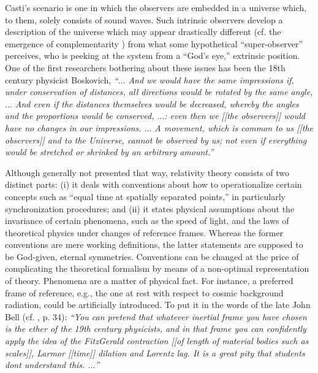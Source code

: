 \documentclass[pra,amsfonts, twocolumn]{revtex4}
\begin{document}
Casti's scenario is one in which
the observers are embedded
in a universe which, to them, solely consists of sound waves. Such
intrinsic observers develop a description
\cite{bos,toffoli:79,roessler1,sv:83,sv:86,sv:86a,sv:93}
of the
universe which may appear drastically different (cf. the
emergence of complementarity
\cite[chapter 10]{sv:93}) from what some hypothetical
``super-observer''
perceives, who is peeking at the system from a ``God's eye,'' extrinsic
position. One of the first researchers
bothering about these issues has been the 18th century physicist
Boskovich,
{\em ``$\ldots$ And we would have the same impressions if, under
conservation of distances, all directions would be rotated by the same
angle, $\ldots$ And even if the distances themselves would be
decreased, whereby the angles and the proportions would be conserved,
$\ldots$: even then we
[[the
observers]]
would have no changes in our
impressions.
$\ldots$ A movement, which is common to us [[the observers]] and
to the Universe, cannot be observed by us; not even if everything would
be stretched or shrinked by an arbitrary amount.''
}


Although generally not presented that way,
relativity theory consists of two distinct parts: (i) it deals with
conventions about how to operationalize certain concepts such as ``equal
time at spatially separated points,'' in particularly synchronization
procedures; and
(ii) it states physical assumptions about the invariance of certain
phenomena, such as the speed of light, and the
laws of theoretical physics under changes of reference frames.
Whereas the former conventions are mere working definitions,
the latter statements are supposed to be God-given, eternal
symmetries. Conventions can be changed at the price of complicating the
theoretical formalism by means of a non-optimal representation of
theory.
Phenomena are a matter of physical fact.
For instance,
a preferred frame of reference, e.g., the one at rest with
respect to cosmic background radiation, could be artificially
introduced.
To put it in the words of the late John Bell (cf. \cite{bell:92}, p.
34):
{\em ``You can pretend that whatever inertial frame you have chosen is
the ether of the 19th century physicists, and in that frame you can
confidently apply the idea of the FitzGerald contraction [[of length of
material bodies such as scales]],  Larmor [[time]] dilation and
Lorentz lag. It is a great pity that students dont understand this.
$\ldots$''}
\end{document}
